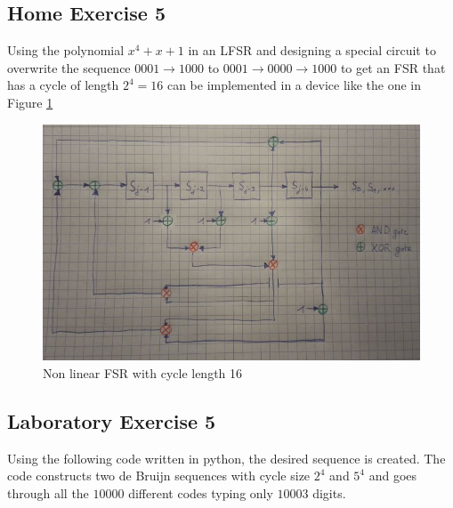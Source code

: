 \documentclass{article}
\begin{document}
\subsection{Home Exercise 5}

Using the polynomial $x^4 + x + 1$ in an LFSR and designing a special circuit to overwrite the sequence $0001 \longrightarrow 1000$ to $0001 \longrightarrow 0000 \longrightarrow 1000$ to get an FSR that has a cycle of length $2^4=16$ can be implemented in a device like the one in Figure \ref{fig:NLFSR}

\begin{figure}[H]
    \centering
    \includegraphics[scale=0.5]{NonLinearFSR.jpg}
    \caption{Non linear FSR with cycle length 16}
    \label{fig:NLFSR}
\end{figure}

\subsection{Laboratory Exercise 5}

Using the following code written in python, the desired sequence is created. The code constructs two de Bruijn sequences with cycle size $2^4$ and $5^4$ and goes through all the $10000$ different codes typing only $10003$ digits.
\end{document}
